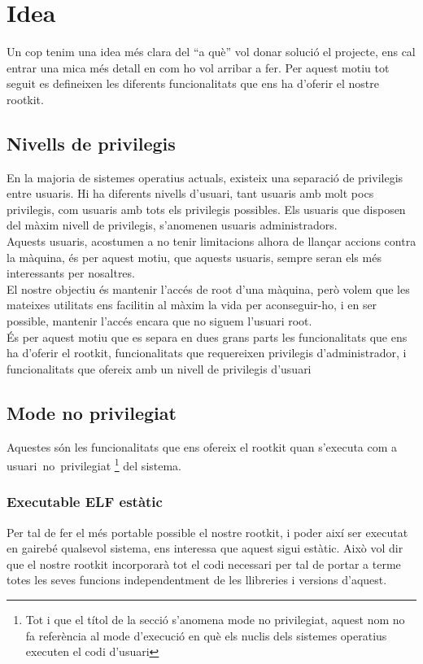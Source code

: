 \chapter{Idea}

Un cop tenim una idea més clara del ``a què'' vol donar solució el projecte, ens cal entrar una mica més
detall en com ho vol arribar a fer. Per aquest motiu tot seguit es defineixen les diferents funcionalitats 
que ens ha d'oferir el nostre rootkit. \\

\section{Nivells de privilegis}

En la majoria de sistemes operatius actuals, existeix una separació de privilegis entre usuaris. Hi
ha diferents nivells d'usuari, tant usuaris amb molt pocs privilegis, com usuaris amb tots els privilegis
possibles. Els usuaris que disposen del màxim nivell de privilegis, s'anomenen usuaris administradors. \\
Aquests usuaris, acostumen a no tenir limitacions alhora de llançar accions contra la màquina, és per aquest
motiu, que aquests usuaris, sempre seran els més interessants per nosaltres. \\

El nostre objectiu és mantenir l'accés de root d'una màquina, però volem que les mateixes utilitats
ens facilitin al màxim la vida per aconseguir-ho, i en ser possible, mantenir l'accés encara que no siguem
l'usuari root. \\

És per aquest motiu que es separa en dues grans parts les funcionalitats que ens ha d'oferir el rootkit,
funcionalitats que requereixen privilegis d'administrador, i funcionalitats que ofereix amb un nivell de privilegis d'usuari

\section{Mode no privilegiat}

Aquestes són les funcionalitats que ens ofereix el rootkit quan s'executa com a \mbox{usuari no privilegiat}
\footnote{Tot i que el títol de la secció s'anomena mode no privilegiat, aquest nom no fa referència al mode d'execució
en què els nuclis dels sistemes operatius executen el codi d'usuari} del sistema.

\subsection{Executable ELF estàtic}
Per tal de fer el més portable possible el nostre rootkit, i poder així ser executat en gairebé qualsevol sistema, ens 
interessa que aquest sigui estàtic. Això vol dir que el nostre rootkit incorporarà tot el codi necessari per tal de portar 
a terme totes les seves funcions independentment de les llibreries i versions d'aquest.

